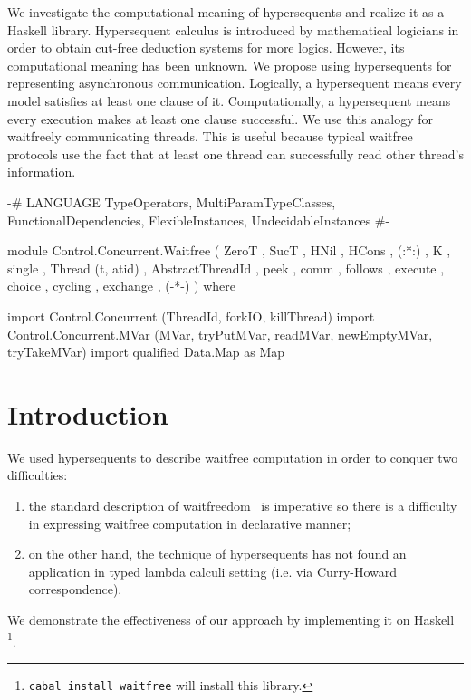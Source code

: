 \documentclass[doctor]{iscs-thesis}
\begin{document}
 We investigate the computational meaning of hypersequents and realize
 it as a Haskell library.
 Hypersequent calculus is introduced by mathematical logicians in order
 to obtain cut-free deduction systems for more logics.  
 However, its
 computational meaning has been unknown.  We propose using hypersequents
 for representing asynchronous communication.  Logically, a hypersequent
 means every model satisfies at least one clause of it.
 Computationally, a hypersequent
 means every execution makes at least one clause
 successful.
 We use this analogy
 for waitfreely communicating threads.  This is useful
 because typical waitfree protocols use the fact that at least one thread
 can successfully read other thread's information.

\begin{code}
 {-# LANGUAGE TypeOperators, MultiParamTypeClasses, FunctionalDependencies, FlexibleInstances, UndecidableInstances #-}

module Control.Concurrent.Waitfree
    ( ZeroT
    , SucT
    , HNil
    , HCons
    , (:*:)
    , K
    , single
    , Thread (t, atid)
    , AbstractThreadId
    , peek
    , comm
    , follows
    , execute
    , choice
    , cycling
    , exchange
    , (-*-)
    )
    where

import Control.Concurrent (ThreadId, forkIO, killThread)
import Control.Concurrent.MVar (MVar, tryPutMVar, readMVar,
 newEmptyMVar, tryTakeMVar)
import qualified Data.Map as Map
\end{code}


\section{Introduction}

We used hypersequents to describe waitfree computation in order to
conquer two difficulties:
\begin{enumerate}
 \item the standard description of waitfreedom~\cite{multiprocessor}
is imperative so there is a difficulty in
expressing waitfree computation in declarative manner;
 \item  on the
other hand, the technique of hypersequents has not found an
application in typed lambda calculi setting (i.e. via Curry-Howard correspondence).
\end{enumerate}
We demonstrate the effectiveness of our approach by implementing it on
Haskell%
\footnote{\texttt{cabal install waitfree} will install this library.}.
\end{document}
